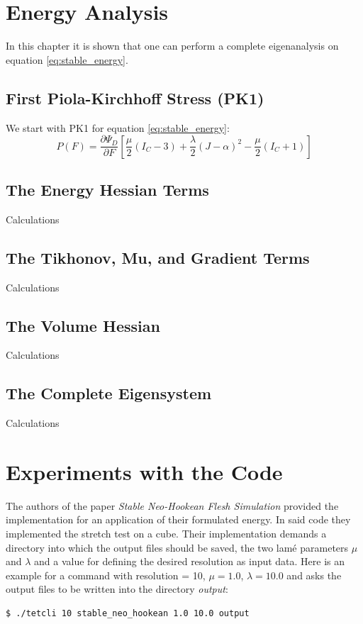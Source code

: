 \section{Energy Analysis}
In this chapter it is shown that one can perform a complete eigenanalysis on equation \ref{eq:stable_energy}.

\subsection{First Piola-Kirchhoff Stress (PK1)}
We start with PK1 for equation \ref{eq:stable_energy}:
\[
P(F) = \frac{\partial \Psi_{D}}{\partial F} \left[ \frac{\mu}{2}\left(I_{C}-3\right) + \frac{\lambda}{2}(J-\alpha)^{2} - \frac{\mu}{2}\left(I_{C}+1\right) \right]
\]

\subsection{The Energy Hessian Terms}
Calculations

\subsection{The Tikhonov, Mu, and Gradient Terms}
Calculations

\subsection{The Volume Hessian}
Calculations
 
\subsection{The Complete Eigensystem}
Calculations




\section{Experiments with the Code}
The authors of the paper \textit{Stable Neo-Hookean Flesh Simulation} \cite{Smith:2018:SNF:3191713.3180491} provided the implementation for an application of their formulated energy. In said code they implemented the stretch test on a cube. Their implementation demands a directory into which the output files should be saved, the two lamé parameters $\mu$ and $\lambda$ and a value for defining the desired resolution as input data. Here is an example for a command with resolution = 10, $\mu=1.0$, $\lambda=10.0$ and asks the output files to be written into the directory \textit{output}:
\begin{lstlisting}[language=bash]
$ ./tetcli 10 stable_neo_hookean 1.0 10.0 output
\end{lstlisting}

